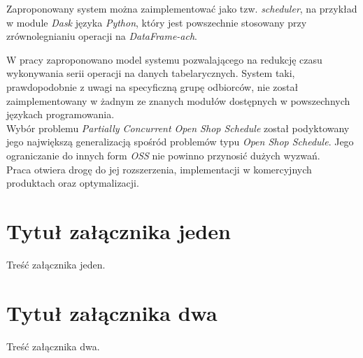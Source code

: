 \documentclass[brudnopis]{xmgr}
\begin{document}
Zaproponowany system można zaimplementować jako tzw. \emph{scheduler}, na przykład w module \emph{Dask} języka \emph{Python}, który jest powszechnie stosowany przy zrównolegnianiu operacji na \emph{DataFrame-ach}.

\summary

W pracy zaproponowano model systemu pozwalającego na redukcję czasu wykonywania serii operacji na danych tabelarycznych. System taki, prawdopodobnie z uwagi na specyficzną grupę odbiorców, nie został zaimplementowany w żadnym ze znanych modułów dostępnych w powszechnych językach programowania.
\medskip\\
Wybór problemu \emph{Partially Concurrent Open Shop Schedule} został podyktowany jego największą generalizacją spośród problemów typu \emph{Open Shop Schedule}. Jego ograniczanie do innych form \emph{OSS} nie powinno przynosić dużych wyzwań.
\medskip\\
Praca otwiera drogę do jej rozszerzenia, implementacji w komercyjnych produktach oraz optymalizacji.

\appendix
\chapter{Tytuł załącznika jeden}

Treść załącznika jeden.

\chapter{Tytuł załącznika dwa}

Treść załącznika dwa.




\listoftables

\listoffigures

\oswiadczenie
\end{document}
